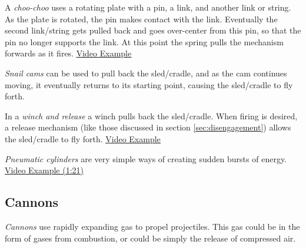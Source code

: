 \begin{asparaenum}[a)]
\item A \textit{choo-choo} uses a rotating plate with a pin, a link, and another link or string. As the plate is rotated, the pin makes contact with the link. Eventually the second link/string gets pulled back and goes over-center from this pin, so that the pin no longer supports the link. At this point the spring pulls the mechanism forwards as it fires. \href{https://www.youtube.com/watch?v=Kh-PVMSF7VU}{\color{red}\underline{Video Example}}

\item \textit{Snail cams} can be used to pull back the sled/cradle, and as the cam continues moving, it eventually returns to its starting point, causing the sled/cradle to fly forth.

\item In a \textit{winch and release} a winch pulls back the sled/cradle. When firing is desired, a release mechanism (like those discussed in section \ref{sec:disengagement}) allows the sled/cradle to fly forth. \href{https://www.youtube.com/watch?v=YFmG_b4B-BE}{\color{red}\underline{Video Example}}

\item \textit{Pneumatic cylinders} are very simple ways of creating sudden bursts of energy. \href{https://youtu.be/1QOYdA5IPJQ?t=81}{\color{red}\underline{Video Example (1:21)}}
\end{asparaenum}

\subsection{Cannons}
\textit{Cannons} use rapidly expanding gas to propel projectiles. This gas could be in the form of gases from combustion, or could be simply the release of compressed air.


